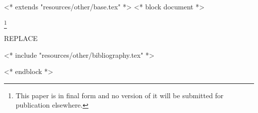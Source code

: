 <* extends "resources/other/base.tex" *>
<* block document *>
\subjclass[2010]{\docclasses}
\keywords{\dockeywords}



\title[\shorttitlename]{\titlename}
\author{<+ user.name +>}
\address{<+ user.address +>}
\thanks{This paper is in final form and no version of it will be submitted for publication elsewhere.}

\begin{abstract}
    REPLACE
\end{abstract}

\maketitle
\tableofcontents

REPLACE

<* include "resources/other/bibliography.tex" *>


<* endblock *>
